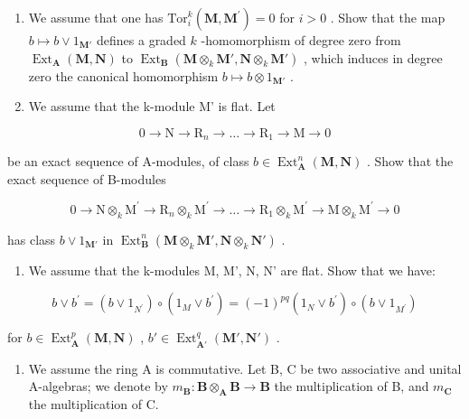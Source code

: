 \begin{enumerate}
\def\labelenumi{\alph{enumi})}
\item
  We assume that one has \(\mathrm{Tor}_{i}^{k}(\mathbf{M},\mathbf{M}^{\prime}) = 0\) for \(i > 0\) . Show that the map \(b\mapsto b\vee 1_{\mathbf{M}'}\) defines a graded \(k\) -homomorphism of degree zero from \(\operatorname{Ext}_{\mathbf{A}}(\mathbf{M},\mathbf{N})\) to \(\operatorname{Ext}_{\mathbf{B}}(\mathbf{M}\otimes_{k}\mathbf{M}',\mathbf{N}\otimes_{k}\mathbf{M}')\) , which induces in degree zero the canonical homomorphism \(b\mapsto b\otimes 1_{\mathbf{M}'}\) .
\item
  We assume that the k-module M' is flat. Let
\end{enumerate}

\[
0 \rightarrow \mathrm{N} \rightarrow \mathrm{R} _ {n} \rightarrow \dots \rightarrow \mathrm{R} _ {1} \rightarrow \mathrm{M} \rightarrow 0
\]

be an exact sequence of A-modules, of class \(b \in \operatorname{Ext}_{\mathbf{A}}^{n}(\mathbf{M}, \mathbf{N})\) . Show that the exact sequence of B-modules

\[
0 \rightarrow \mathrm{N} \otimes_ {k} \mathrm{M} ^ {\prime} \rightarrow \mathrm{R} _ {n} \otimes_ {k} \mathrm{M} ^ {\prime} \rightarrow \dots \rightarrow \mathrm{R} _ {1} \otimes_ {k} \mathrm{M} ^ {\prime} \rightarrow \mathrm{M} \otimes_ {k} \mathrm{M} ^ {\prime} \rightarrow 0
\]

has class \(b \vee 1_{\mathbf{M}'}\) in \(\operatorname{Ext}_{\mathbf{B}}^{n}(\mathbf{M} \otimes_{k} \mathbf{M}', \mathbf{N} \otimes_{k} \mathbf{N}')\) .

\begin{enumerate}
\def\labelenumi{\alph{enumi})}
\setcounter{enumi}{2}
\tightlist
\item
  We assume that the k-modules M, M', N, N' are flat. Show that we have:
\end{enumerate}

\[
b \vee b ^ {\prime} = (b \vee 1 _ {N ^ {\prime}}) \circ (1 _ {M} \vee b ^ {\prime}) = (- 1) ^ {p q} (1 _ {N} \vee b ^ {\prime}) \circ (b \vee 1 _ {M ^ {\prime}})
\]

for \(b \in \operatorname{Ext}_{\mathbf{A}}^{p}(\mathbf{M}, \mathbf{N})\) , \(b' \in \operatorname{Ext}_{\mathbf{A}'}^{q}(\mathbf{M}', \mathbf{N}')\) .

\begin{enumerate}
\def\labelenumi{\arabic{enumi})}
\setcounter{enumi}{8}
\tightlist
\item
  We assume the ring A is commutative. Let B, C be two associative and unital A-algebras; we denote by \(m_{\mathbf{B}}: \mathbf{B} \otimes_{\mathbf{A}} \mathbf{B} \to \mathbf{B}\) the multiplication of B, and \(m_{\mathbf{C}}\) the multiplication of C.
\end{enumerate}

